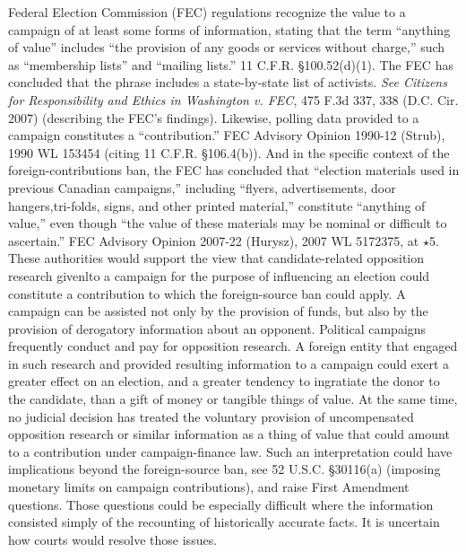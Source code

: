 Federal Election Commission (FEC) regulations recognize the value to a campaign of at least some forms of information, stating that the term ``anything of value'' includes ``the provision of any goods or services without charge,'' such as ``membership lists'' and ``mailing lists.''
11 C.F.R. \S 100.52(d)(1).
The FEC has concluded that the phrase includes a state-by-state list of activists.
\textit{See Citizens for Responsibility and Ethics in Washington v. FEC}, 475 F.3d 337, 338 (D.C. Cir. 2007) (describing the FEC's findings).
Likewise, polling data provided to a campaign constitutes a ``contribution.''
FEC Advisory Opinion 1990-12 (Strub), 1990 WL 153454 (citing 11 C.F.R. \S 106.4(b)).
And in the specific context of the foreign-contributions ban, the FEC has concluded that ``election materials used in previous Canadian campaigns,'' including ``flyers, advertisements, door hangers,tri-folds, signs, and other printed material,'' constitute ``anything of value,'' even though ``the value of these materials may be nominal or difficult to ascertain.''
FEC Advisory Opinion 2007-22 (Hurysz), 2007 WL 5172375, at $\star$5.
These authorities would support the view that candidate-related opposition research givenlto a campaign for the purpose of influencing an election could constitute a contribution to which the foreign-source ban could apply.
A campaign can be assisted not only by the provision of funds, but also by the provision of derogatory information about an opponent.
Political campaigns frequently conduct and pay for opposition research.
A foreign entity that engaged in such research and provided resulting information to a campaign could exert a greater effect on an election, and a greater tendency to ingratiate the donor to the candidate, than a gift of money or tangible things of value.
At the same time, no judicial decision has treated the voluntary provision of uncompensated opposition research or similar information as a thing of value that could amount to a contribution under campaign-finance law.
Such an interpretation could have implications beyond the foreign-source ban, see 52 U.S.C. \S 30116(a) (imposing monetary limits on campaign contributions), and raise First Amendment questions.
Those questions could be especially difficult where the information consisted simply of the recounting of historically accurate facts.
It is uncertain how courts would resolve those issues.

